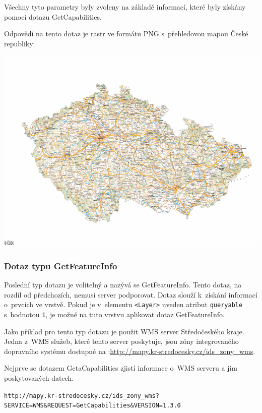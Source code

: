 \documentclass[a4paper,12pt]{article}
\begin{document}
Všechny tyto parametry byly zvoleny na základě informací, které byly
získány pomocí dotazu GetCapabilities.

Odpovědí na tento dotaz je rastr ve formátu PNG s~přehledovou mapou
České republiky:

\begin{center}
 \includegraphics[scale=0.5]{figures/GetMapResponse}
\end{center}

\subsubsection{Dotaz typu GetFeatureInfo}
Poslední typ dotazu je volitelný a nazývá se GetFeatureInfo. Tento
dotaz, na rozdíl od předchozích, nemusí server podporovat.  
Dotaz slouží k~získání informací o~prvcích ve vrstvě. Pokud je
v~elementu {\tt <Layer>} uveden atribut {\tt queryable} s~hodnotou {\tt 1}, je možné na
tuto vrstvu aplikovat dotaz GetFeatureInfo.

Jako příklad pro tento typ dotazu je použit WMS server Středočeského
kraje. Jedna z~WMS služeb, které tento server poskytuje, jsou zóny
integrovaného dopravního systému dostupné na
:\url{http://mapy.kr-stredocesky.cz/ids_zony_wms}. 

Nejprve se dotazem
GetaCapabilities zjistí informace o~WMS serveru a jím poskytovaných
datech.

\begin{alltt}\footnotesize
http://mapy.kr-stredocesky.cz/ids\_zony\_wms?
SERVICE=WMS\&REQUEST=GetCapabilities\&VERSION=1.3.0
\end{alltt}
\end{document}
